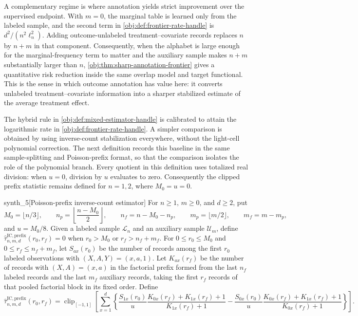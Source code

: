 \documentclass[11pt]{article}
\begin{document}
A complementary regime is where annotation yields strict improvement over the supervised endpoint. With \(m=0\), the marginal table is learned only from the labeled sample, and the second term in \cref{obj:def:frontier-rate-handle} is \(d^2/(n^2\ell_n^2)\). Adding outcome-unlabeled treatment--covariate records replaces \(n\) by \(n+m\) in that component. Consequently, when the alphabet is large enough for the marginal-frequency term to matter and the auxiliary sample makes \(n+m\) substantially larger than \(n\), \cref{obj:thm:sharp-annotation-frontier} gives a quantitative risk reduction inside the same overlap model and target functional. This is the sense in which outcome annotation has value here: it converts unlabeled treatment--covariate information into a sharper stabilized estimate of the average treatment effect.

The hybrid rule in \cref{obj:def:mixed-estimator-handle} is calibrated to attain the logarithmic rate in \cref{obj:def:frontier-rate-handle}. A simpler comparison is obtained by using inverse-count stabilization everywhere, without the light-cell polynomial correction. The next definition records this baseline in the same sample-splitting and Poisson-prefix format, so that the comparison isolates the role of the polynomial branch. Every quotient in this definition uses totalized real division: when \(u=0\), division by \(u\) evaluates to zero. Consequently the clipped prefix statistic remains defined for \(n=1,2\), where \(M_0=u=0\).

\begin{definitionv}{synth_5}[Poisson-prefix inverse-count estimator]
For \(n\ge1\), \(m\ge0\), and \(d\ge2\), put
\[
M_0=\lfloor n/3\rfloor,\qquad
n_p=\left\lfloor\frac{n-M_0}{2}\right\rfloor,\qquad
n_f=n-M_0-n_p,\qquad
m_p=\lfloor m/2\rfloor,\qquad
m_f=m-m_p,
\]
and \(u=M_0/8\). Given a labeled sample \(\mathcal L_n\) and an auxiliary sample \(\mathcal U_m\), define \(\widehat\tau^{\mathrm{IC,prefix}}_{n,m,d}(r_0,r_f)=0\) when \(r_0>M_0\) or \(r_f>n_f+m_f\). For \(0\le r_0\le M_0\) and \(0\le r_f\le n_f+m_f\), let \(S_{ax}(r_0)\) be the number of records among the first \(r_0\) labeled observations with \((X,A,Y)=(x,a,1)\). Let \(K_{ax}(r_f)\) be the number of records with \((X,A)=(x,a)\) in the factorial prefix formed from the last \(n_f\) labeled records and the last \(m_f\) auxiliary records, taking the first \(r_f\) records of that pooled factorial block in its fixed order. Define
\[
\widehat\tau^{\mathrm{IC,prefix}}_{n,m,d}(r_0,r_f)
=
\operatorname{clip}_{[-1,1]}
\left[
\sum_{x=1}^d
\left\{
\frac{S_{1x}(r_0)}{u}
\frac{K_{0x}(r_f)+K_{1x}(r_f)+1}{K_{1x}(r_f)+1}
-
\frac{S_{0x}(r_0)}{u}
\frac{K_{0x}(r_f)+K_{1x}(r_f)+1}{K_{0x}(r_f)+1}
\right\}
\right].
\]
\end{definitionv}
\end{document}
